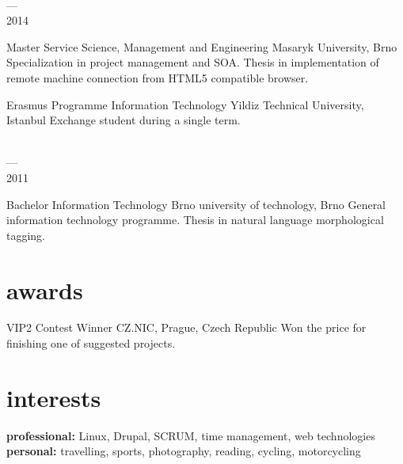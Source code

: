 \documentclass[]{friggeri-cv} %
\begin{document}
\begin{entrylist}
  \entry
  {\parbox[t]{2cm}{ \\ --- \\ 2014}}
  {Master {\normalfont Service Science, Management and Engineering}}
  {Masaryk University, Brno}
  {
    \thesis
    {Specialization in project management and SOA.}
    {Thesis in implementation of remote machine connection from HTML5 compatible browser.}
  }
  \entry
  {\parbox[t]{2cm}{}}
  {Erasmus Programme {\normalfont Information Technology}}
  {Yildiz Technical University, Istanbul}
  {Exchange student during a single term.\medskip}
  \entry
  {\parbox[t]{2cm}{ \\ --- \\ 2011}}
  {Bachelor {\normalfont Information Technology}}
  {Brno university of technology, Brno}
  {
    \thesis
    {General information technology programme.}
    {Thesis in natural language morphological tagging.}
  }
\end{entrylist}


\section{awards}

\begin{entrylist}
\entry
{\parbox[t]{2cm}{}}
{VIP2 Contest Winner}
{CZ.NIC, Prague, Czech Republic}
{Won the price for finishing one of suggested projects.}
\end{entrylist}


\section{interests}

\textbf{professional:} Linux, Drupal, SCRUM, time management, web technologies \\
\textbf{personal:} travelling, sports, photography, reading, cycling, motorcycling
\end{document}
